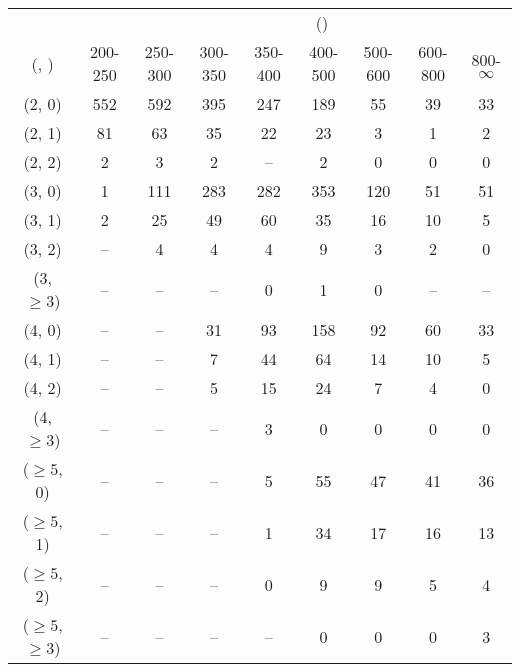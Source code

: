 \begin{table}[h!]
\tiny
\centering
{}
\begin{tabular}
{ccccccccc}
	\hline\hline
&	& \multicolumn{8}{c}{\scalht (\gev)} \\ 
	 (\njet,  \nb) & 200-250 & 250-300 & 300-350 & 350-400 & 400-500 & 500-600 & 600-800 & 800-$\infty$ \\ [0.8ex] 
\hline
	(2, 0) & 552 & 592 & 395 & 247 & 189 & 55 & 39 & 33 \\[0.5ex] 
	(2, 1) & 81 & 63 & 35 & 22 & 23 & 3 & 1 & 2 \\[0.5ex] 
	(2, 2) & 2 & 3 & 2 & -- & 2 & 0 & 0 & 0 \\[0.5ex] 
	(3, 0) & 1 & 111 & 283 & 282 & 353 & 120 & 51 & 51 \\[0.5ex] 
	(3, 1) & 2 & 25 & 49 & 60 & 35 & 16 & 10 & 5 \\[0.5ex] 
	(3, 2) & -- & 4 & 4 & 4 & 9 & 3 & 2 & 0 \\[0.5ex] 
	(3, $\ge3$) & -- & -- & -- & 0 & 1 & 0 & -- & -- \\[0.5ex] 
	(4, 0) & -- & -- & 31 & 93 & 158 & 92 & 60 & 33 \\[0.5ex] 
	(4, 1) & -- & -- & 7 & 44 & 64 & 14 & 10 & 5 \\[0.5ex] 
	(4, 2) & -- & -- & 5 & 15 & 24 & 7 & 4 & 0 \\[0.5ex] 
	(4, $\ge3$) & -- & -- & -- & 3 & 0 & 0 & 0 & 0 \\[0.5ex] 
	($\ge5$, 0) & -- & -- & -- & 5 & 55 & 47 & 41 & 36 \\[0.5ex] 
	($\ge5$, 1) & -- & -- & -- & 1 & 34 & 17 & 16 & 13 \\[0.5ex] 
	($\ge5$, 2) & -- & -- & -- & 0 & 9 & 9 & 5 & 4 \\[0.5ex] 
	($\ge5$, $\ge3$) & -- & -- & -- & -- & 0 & 0 & 0 & 3 \\[0.5ex] 
	\hline
	\hline
\end{tabular}
\end{table}
